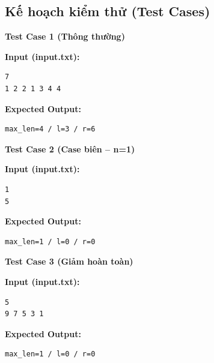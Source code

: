 \subsection{Kế hoạch kiểm thử (Test Cases)}

\textbf{Test Case 1 (Thông thường)}

\textbf{Input (input.txt):}
\begin{lstlisting}
7
1 2 2 1 3 4 4
\end{lstlisting}

\textbf{Expected Output:}
\begin{lstlisting}
max_len=4 / l=3 / r=6
\end{lstlisting}

\vspace{0.5cm}

\textbf{Test Case 2 (Case biên -- n=1)}

\textbf{Input (input.txt):}
\begin{lstlisting}
1
5
\end{lstlisting}

\textbf{Expected Output:}
\begin{lstlisting}
max_len=1 / l=0 / r=0
\end{lstlisting}

\vspace{0.5cm}

\textbf{Test Case 3 (Giảm hoàn toàn)}

\textbf{Input (input.txt):}
\begin{lstlisting}
5
9 7 5 3 1
\end{lstlisting}

\textbf{Expected Output:}
\begin{lstlisting}
max_len=1 / l=0 / r=0
\end{lstlisting}
